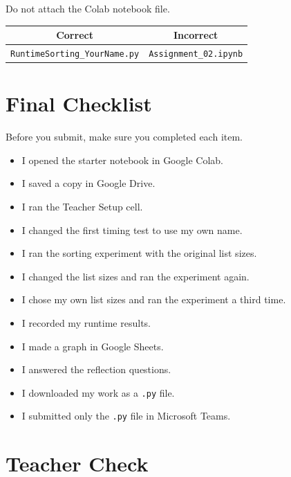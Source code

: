 \documentclass[11pt]{article}
\newcommand{\checkbox}{$\square$}
\begin{document}
\noindent
Do not attach the Colab notebook file.

\begin{center}
\begin{tabular}{|c|c|}
\hline
\textbf{Correct} & \textbf{Incorrect} \\
\hline
\texttt{RuntimeSorting\_YourName.py} & \texttt{Assignment\_02.ipynb} \\
\hline
\end{tabular}
\end{center}

\section*{Final Checklist}

Before you submit, make sure you completed each item.

\begin{itemize}
    \item[\checkbox] I opened the starter notebook in Google Colab.
    \item[\checkbox] I saved a copy in Google Drive.
    \item[\checkbox] I ran the Teacher Setup cell.
    \item[\checkbox] I changed the first timing test to use my own name.
    \item[\checkbox] I ran the sorting experiment with the original list sizes.
    \item[\checkbox] I changed the list sizes and ran the experiment again.
    \item[\checkbox] I chose my own list sizes and ran the experiment a third time.
    \item[\checkbox] I recorded my runtime results.
    \item[\checkbox] I made a graph in Google Sheets.
    \item[\checkbox] I answered the reflection questions.
    \item[\checkbox] I downloaded my work as a \texttt{.py} file.
    \item[\checkbox] I submitted only the \texttt{.py} file in Microsoft Teams.
\end{itemize}

\section*{Teacher Check}
\end{document}
